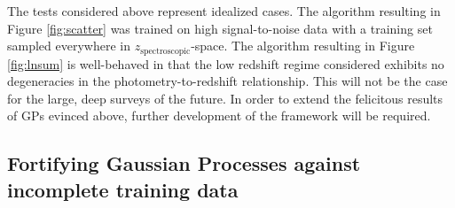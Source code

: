 \documentclass[useAMS,usenatbib,tightenlines,11pt,preprint]{aastex}
\begin{document}
The tests considered above represent idealized cases.
The algorithm resulting in Figure \ref{fig:scatter} was trained on high
signal-to-noise data with a training set sampled everywhere in
$z_\text{spectroscopic}$-space.  The algorithm resulting in Figure
\ref{fig:lnsum} is well-behaved in that the low redshift regime considered
exhibits no degeneracies in the photometry-to-redshift relationship.  This will
not be the case for the large, deep surveys of the future.  In order to extend
the felicitous results of GPs evinced above, further development of the
framework will be required.

\subsection{Fortifying Gaussian Processes against incomplete training data}
\end{document}
